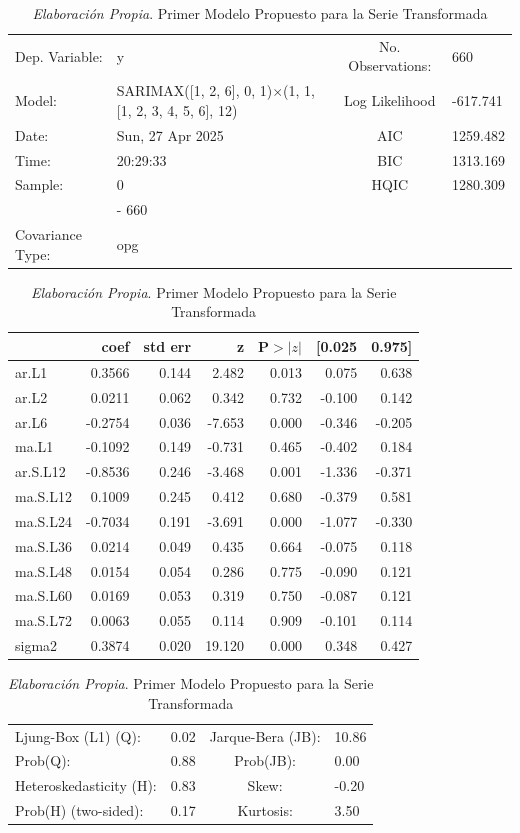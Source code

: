 \documentclass[12pt,letterpaper]{article}   %
\begin{document}
\begin{table}[htbp]
\centering
\tiny
\caption{\textit{Elaboración Propia}. Primer Modelo Propuesto para la Serie Transformada}
\begin{tabular}{llcl}
\toprule
Dep. Variable: & y & No. Observations: & 660 \\
Model: & SARIMAX([1, 2, 6], 0, 1)$\times$(1, 1, [1, 2, 3, 4, 5, 6], 12) & Log Likelihood & -617.741 \\
Date: & Sun, 27 Apr 2025 & AIC & 1259.482 \\
Time: & 20:29:33 & BIC & 1313.169 \\
Sample: & 0 & HQIC & 1280.309 \\
        & - 660 & & \\
Covariance Type: & opg & & \\
\bottomrule
\end{tabular}

\vspace{0.3cm}

\begin{tabular}{lrrrrrr}
\toprule
 & \textbf{coef} & \textbf{std err} & \textbf{z} & \textbf{P$>|z|$} & \textbf{[0.025} & \textbf{0.975]} \\
\midrule
ar.L1     & 0.3566  & 0.144 & 2.482 & 0.013 & 0.075 & 0.638 \\
ar.L2     & 0.0211  & 0.062 & 0.342 & 0.732 & -0.100 & 0.142 \\
ar.L6     & -0.2754 & 0.036 & -7.653 & 0.000 & -0.346 & -0.205 \\
ma.L1     & -0.1092 & 0.149 & -0.731 & 0.465 & -0.402 & 0.184 \\
ar.S.L12  & -0.8536 & 0.246 & -3.468 & 0.001 & -1.336 & -0.371 \\
ma.S.L12  & 0.1009  & 0.245 & 0.412  & 0.680 & -0.379 & 0.581 \\
ma.S.L24  & -0.7034 & 0.191 & -3.691 & 0.000 & -1.077 & -0.330 \\
ma.S.L36  & 0.0214  & 0.049 & 0.435  & 0.664 & -0.075 & 0.118 \\
ma.S.L48  & 0.0154  & 0.054 & 0.286  & 0.775 & -0.090 & 0.121 \\
ma.S.L60  & 0.0169  & 0.053 & 0.319  & 0.750 & -0.087 & 0.121 \\
ma.S.L72  & 0.0063  & 0.055 & 0.114  & 0.909 & -0.101 & 0.114 \\
sigma2    & 0.3874  & 0.020 & 19.120 & 0.000 & 0.348  & 0.427 \\
\bottomrule
\end{tabular}

\vspace{0.3cm}

\begin{tabular}{llcl}
\toprule
Ljung-Box (L1) (Q): & 0.02 & Jarque-Bera (JB): & 10.86 \\
Prob(Q): & 0.88 & Prob(JB): & 0.00 \\
Heteroskedasticity (H): & 0.83 & Skew: & -0.20 \\
Prob(H) (two-sided): & 0.17 & Kurtosis: & 3.50 \\
\bottomrule
\end{tabular}

\end{table}
\end{document}
